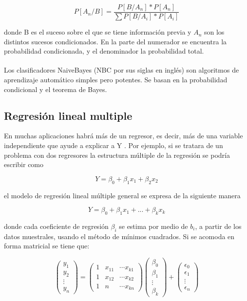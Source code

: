 \documentclass[conference]{IEEEtran}
\begin{document}
\begin{equation}
P[A_n/B]= \frac{P[B/A_n]*P[A_n]}{\sum P[B/A_i]*P[A_i]}
\end{equation}

donde B es el suceso sobre el que se tiene información previa y $A_n$ son los distintos sucesos condicionados. En la parte del numerador se encuentra la probabilidad condicionada, y el denominador la probabilidad total. \\
\\
Los clasificadores NaiveBayes (NBC por sus siglas en inglés) son algoritmos de aprendizaje automático simples pero potentes. Se basan en la probabilidad condicional y el teorema de Bayes. 
\subsection{Regresión lineal multiple}
En muchas aplicaciones habrá más de un regresor, es decir, más de una variable independiente que ayude a explicar a Y \cite{b2}. Por ejemplo, si se tratara de un problema con dos regresores la estructura múltiple de la regresión se podría escribir como

\begin{equation}
Y= \beta_0 + \beta_1x_1 + \beta_2x_2
\end{equation}

el modelo de regresión lineal múltiple general se expresa de la siguiente manera 


\begin{equation}
Y= \beta_0 + \beta_1x_1 + ... + \beta_kx_k
\end{equation}

donde cada coeficiente de regresión $\beta_i$ se estima por medio de $b_i$, a partir de los datos muestrales, usando el método de mínimos cuadrados. Si se acomoda en forma matricial se tiene que:

\begin{equation}
\begin{pmatrix}
y_1 \\
y_2 \\
\vdots \\
y_n 
\end{pmatrix}
=
\begin{pmatrix}
1 & x_{11} & \dotsi x_{k1}\\
1 & x_{12} & \dotsi x_{k2}\\
1 & n & \dotsi x_{kn}
\end{pmatrix}
\begin{pmatrix}
\beta_0 \\
\beta_1 \\
\vdots \\
\beta_k
\end{pmatrix}
+
\begin{pmatrix}
\epsilon_0 \\
\epsilon_1 \\
\vdots \\
\epsilon_n
\end{pmatrix}
\end{equation}
\end{document}
